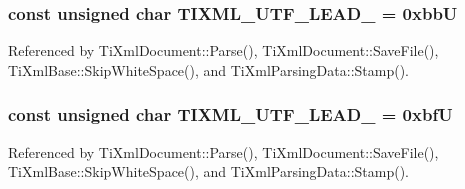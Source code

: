 \subsubsection[TIXML\_\-UTF\_\-LEAD\_\-1]{\setlength{\rightskip}{0pt plus 5cm}const unsigned char {\bf TIXML\_\-UTF\_\-LEAD\_} = 0xbbU}\label{tinyxmlparser_8cpp_3cda92a178036c812663a7b75c5e04d0}




Referenced by TiXmlDocument::Parse(), TiXmlDocument::SaveFile(), TiXmlBase::SkipWhiteSpace(), and TiXmlParsingData::Stamp().
\subsubsection[TIXML\_\-UTF\_\-LEAD\_\-2]{\setlength{\rightskip}{0pt plus 5cm}const unsigned char {\bf TIXML\_\-UTF\_\-LEAD\_} = 0xbfU}\label{tinyxmlparser_8cpp_8e36ce25f81f009c066037e937da3a6a}




Referenced by TiXmlDocument::Parse(), TiXmlDocument::SaveFile(), TiXmlBase::SkipWhiteSpace(), and TiXmlParsingData::Stamp().